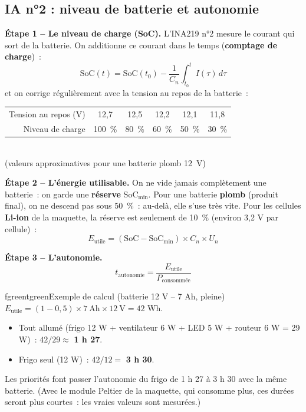 \documentclass[10pt,a4paper]{article}
\begin{document}
\subsection{IA n°2 : niveau de batterie et autonomie}
\textbf{Étape 1 -- Le niveau de charge (SoC).} L'INA219 n°2 mesure le courant qui sort de la batterie. On additionne ce courant dans le temps (\textbf{comptage de charge})~:
\[ \mathrm{SoC}(t) = \mathrm{SoC}(t_0) - \frac{1}{C_n}\int_{t_0}^{t} I(\tau)\,d\tau \]
et on corrige régulièrement avec la tension au repos de la batterie~:
\begin{center}
\begin{tabular}{rccccc}
Tension au repos (V) & 12,7 & 12,5 & 12,2 & 12,1 & 11,8 \\
Niveau de charge & 100~\% & 80~\% & 60~\% & 50~\% & 30~\% \\
\end{tabular}\\[1mm]
{\small (valeurs approximatives pour une batterie plomb 12~V)}
\end{center}

\textbf{Étape 2 -- L'énergie utilisable.} On ne vide jamais complètement une batterie~: on garde une \textbf{réserve} $\mathrm{SoC}_{\min}$. Pour une batterie \textbf{plomb} (produit final), on ne descend pas sous 50~\%~: au-delà, elle s'use très vite. Pour les cellules \textbf{Li-ion} de la maquette, la réserve est seulement de 10~\% (environ 3,2 V par cellule)~:
\[ E_{\text{utile}} = (\mathrm{SoC} - \mathrm{SoC}_{\min}) \times C_n \times U_n \]

\textbf{Étape 3 -- L'autonomie.}
\[ t_{\text{autonomie}} = \frac{E_{\text{utile}}}{P_{\text{consommée}}} \]

\begin{tbox}{fgreen}{tgreen}{Exemple de calcul (batterie 12 V -- 7 Ah, pleine)}
$E_{\text{utile}} = (1 - 0{,}5) \times 7\ \text{Ah} \times 12\ \text{V} = 42$ Wh.
\begin{itemize}[nosep]
  \item Tout allumé (frigo 12 W + ventilateur 6 W + LED 5 W + routeur 6 W = 29 W)~: $42/29 \approx$ \textbf{1 h 27}.
  \item Frigo seul (12 W)~: $42/12 =$ \textbf{3 h 30}.
\end{itemize}
Les priorités font passer l'autonomie du frigo de 1 h 27 à 3 h 30 avec la même batterie. (Avec le module Peltier de la maquette, qui consomme plus, ces durées seront plus courtes~: les vraies valeurs sont mesurées.)
\end{tbox}
\end{document}
